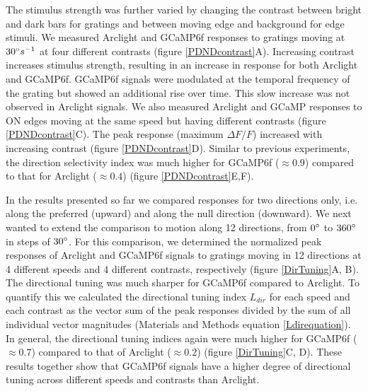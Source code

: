 \documentclass[9pt,lineno]{elife}
\begin{document}
The stimulus strength was further varied by changing the contrast between bright and dark bars for gratings and between moving edge and background for edge stimuli. We measured Arclight and GCaMP6f responses to gratings moving at $30\degree s^{-1}$ at four different contrasts (figure \ref{PDNDcontrast}A). Increasing contrast increases stimulus strength, resulting in an increase in response for both Arclight and GCaMP6f. GCaMP6f signals were modulated at the temporal frequency of the grating but showed an additional rise over time. This slow increase was not observed in Arclight signals. We also measured Arclight and GCaMP responses to ON edges moving at the same speed but having different contrasts (figure \ref{PDNDcontrast}C). The peak response (maximum $\Delta F/F$) increased with increasing contrast (figure \ref{PDNDcontrast}D). Similar to previous experiments, the direction selectivity index was much higher for GCaMP6f ($\approx0.9$) compared to that for Arclight ($\approx0.4$) (figure \ref{PDNDcontrast}E,F). 

In the results presented so far we compared responses for two directions only, i.e. along the preferred (upward) and along the null direction (downward). We next wanted to extend the comparison to motion along 12 directions, from $0\degree$ to $360\degree$ in steps of $30\degree$. For this comparison, we determined the normalized peak responses of Arclight and GCaMP6f signals to gratings moving in 12 directions at 4 different speeds and 4 different contrasts, respectively (figure \ref{DirTuning}A, B). The directional tuning was much sharper for GCaMP6f compared to Arclight. To quantify this we calculated the directional tuning index $L_{dir}$ \parencite{Mazurek2014} for each speed and each contrast as the vector sum of the peak responses divided by the sum of all individual vector magnitudes (Materials and Methods equation \eqref{Ldirequation}). In general, the directional tuning indices again were much higher for GCaMP6f ($\approx0.7$) compared to that of Arclight ($\approx0.2$) (figure \ref{DirTuning}C, D). These results together show that GCaMP6f signals have a higher degree of directional tuning across different speeds and contrasts than Arclight.
\end{document}
